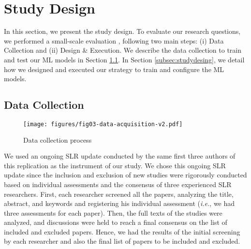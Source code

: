 \section {Study Design}
\label{sec:methodology}




In this section, we present the study design. To evaluate our research questions, we performed a small-scale evaluation \cite{Wohlin2022cs}, following two main steps: (i) Data Collection and (ii) Design \& Execution. We describe the data collection to train and test our ML models in Section \ref{subsec:data}. In Section \ref{subsec:studydesing}, we detail how we designed and executed our strategy to train and configure the ML models. 

\subsection{Data Collection}
\label{subsec:data}

\begin{figure*} [ht]
    \centering
    \texttt{[image: figures/fig03-data-acquisition-v2.pdf]}
    \caption{Data collection process}
    \label{fig:fig-data-selection}
\end{figure*}

We used an ongoing SLR update conducted by the same first three authors of this replication \cite{Wohlin2022} as the instrument of our study. We chose this ongoing SLR update since the inclusion and exclusion of new studies were rigorously conducted based on individual assessments and the consensus of three experienced SLR researchers. First, each researcher screened all the papers, analyzing the title, abstract, and keywords and registering his individual assessment (\textit{i.e.}, we had three assessments for each paper). Then, the full texts of the studies were analyzed, and discussions were held to reach a final consensus on the list of included and excluded papers. Hence, we had the results of the initial screening by each researcher and also the final list of papers to be included and excluded.


